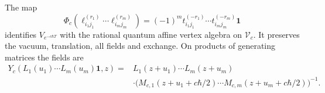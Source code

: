 \begin{theorem}\label{cylev:thm:rtt-comparison}
The map
\begin{equation}\label{cylev:eq:rtt-state-map}
 \Phi_c(\ell_{i_1j_1}^{(r_1)}\cdots\ell_{i_mj_m}^{(r_m)})
       =(-1)^m t_{i_1j_1}^{(-r_1)}\cdots
                        t_{i_mj_m}^{(-r_m)}\mathbf1
\end{equation}
identifies $V_{e^{-c\hbar T}}$ with the rational quantum affine
vertex algebra on $\mathcal V_c$.
It preserves the vacuum, translation, all fields and exchange.
On products of generating matrices the fields are
\begin{equation}\label{cylev:eq:rtt-fields}
\begin{split}
 Y_c(L_1(u_1)\cdots L_m(u_m)\mathbf1,z)
 ={}&L_1(z+u_1)\cdots L_m(z+u_m)\\
 &\cdot\bigl(M_{c,1}(z+u_1+c\hbar/2)\cdots
               M_{c,m}(z+u_m+c\hbar/2)\bigr)^{-1}.
\end{split}
\end{equation}
\end{theorem}
